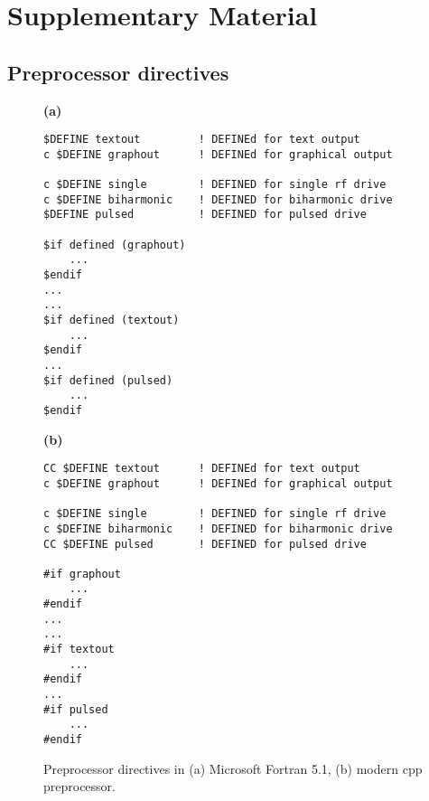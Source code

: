 \section{Supplementary Material}

\begin{supplement}


\subsection{Preprocessor directives}

\begin{figure}[h]
\centering

\begin{minipage}{0.48\textwidth}
\textbf{(a)}
\begin{lstlisting}
$DEFINE textout			! DEFINEd for text output
c $DEFINE graphout		! DEFINEd for graphical output

c $DEFINE single        ! DEFINED for single rf drive
c $DEFINE biharmonic    ! DEFINED for biharmonic drive
$DEFINE pulsed			! DEFINED for pulsed drive

$if defined (graphout)
	...
$endif
...
...
$if defined (textout)
	...
$endif
...
$if defined (pulsed)
	...
$endif
\end{lstlisting}
\end{minipage}
%
\hfill
%
\begin{minipage}{0.48\textwidth}
\textbf{(b)}
\begin{lstlisting}
CC $DEFINE textout		! DEFINEd for text output
c $DEFINE graphout		! DEFINEd for graphical output

c $DEFINE single        ! DEFINED for single rf drive
c $DEFINE biharmonic    ! DEFINED for biharmonic drive
CC $DEFINE pulsed		! DEFINED for pulsed drive

#if graphout
	...
#endif
...
...
#if textout
	...
#endif
...
#if pulsed
	...
#endif
\end{lstlisting}
\end{minipage}

\caption{Preprocessor directives in (a) Microsoft Fortran 5.1, (b) modern \textsf{cpp} preprocessor.}
\label{fig:preprocessor}
\end{figure}


\end{supplement}

